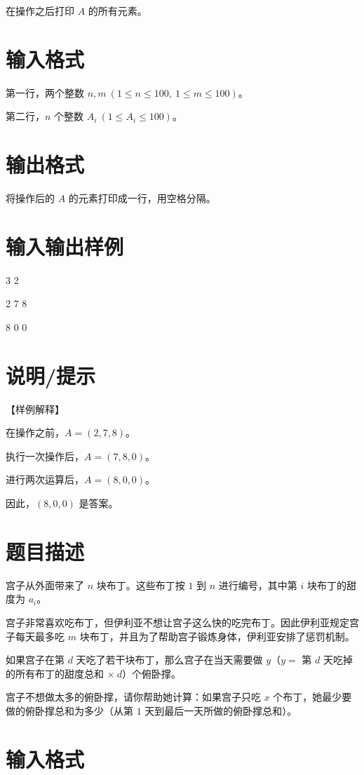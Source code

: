 \documentclass{../cpct/ctpro}
\begin{document}
在操作之后打印 $A$ 的所有元素。

\section*{输入格式}

第一行，两个整数 $n,m~(1 \leq n \leq 100,~1 \leq m \leq100)$。

第二行，$n$ 个整数 $A_i~(1 \leq A_i \leq 100)$。

\section*{输出格式}

将操作后的 $A$ 的元素打印成一行，用空格分隔。

\section*{输入输出样例}
\testcasetab
{
    3 2\par
    2 7 8
}
{
    8 0 0
}

\section*{说明/提示}

【样例解释】

在操作之前，$A=(2,7,8)$。

执行一次操作后，$A=(7,8,0)$。

进行两次运算后，$A=(8,0,0)$。

因此，$(8,0,0)$ 是答案。

\makeproblem
\section*{题目描述}

宫子从外面带来了 $n$ 块布丁。这些布丁按 $1$ 到 $n$ 进行编号，其中第 $i$ 块布丁的甜度为 $a_i$。

宫子非常喜欢吃布丁，但伊利亚不想让宫子这么快的吃完布丁。因此伊利亚规定宫子每天最多吃 $m$ 块布丁，并且为了帮助宫子锻炼身体，伊利亚安排了惩罚机制。

如果宫子在第 $d$ 天吃了若干块布丁，那么宫子在当天需要做 $y$（$y=$ 第 $d$ 天吃掉的所有布丁的甜度总和 $\times~d$）个俯卧撑。

宫子不想做太多的俯卧撑，请你帮助她计算：如果宫子只吃 $x$ 个布丁，她最少要做的俯卧撑总和为多少（从第 $1$ 天到最后一天所做的俯卧撑总和）。

\section*{输入格式}
\end{document}
